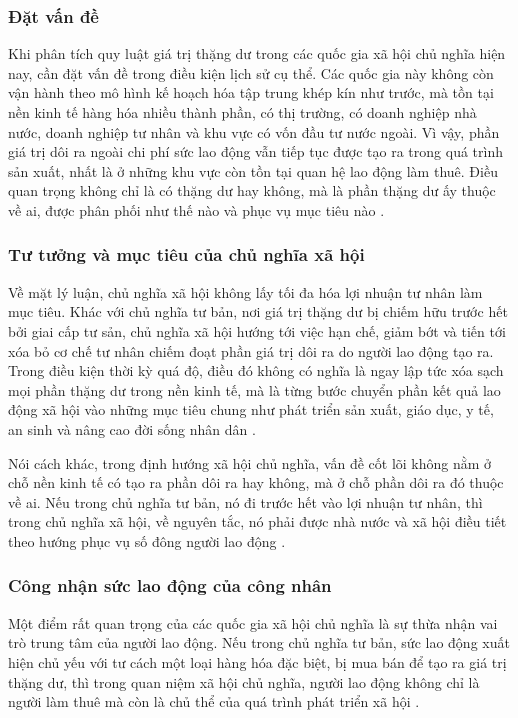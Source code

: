\subsubsection{Đặt vấn đề}

Khi phân tích quy luật giá trị thặng dư trong các quốc gia xã hội chủ nghĩa hiện nay, cần đặt vấn đề trong điều kiện lịch sử cụ thể. Các quốc gia này không còn vận hành theo mô hình kế hoạch hóa tập trung khép kín như trước, mà tồn tại nền kinh tế hàng hóa nhiều thành phần, có thị trường, có doanh nghiệp nhà nước, doanh nghiệp tư nhân và khu vực có vốn đầu tư nước ngoài. Vì vậy, phần giá trị dôi ra ngoài chi phí sức lao động vẫn tiếp tục được tạo ra trong quá trình sản xuất, nhất là ở những khu vực còn tồn tại quan hệ lao động làm thuê. Điều quan trọng không chỉ là có thặng dư hay không, mà là phần thặng dư ấy thuộc về ai, được phân phối như thế nào và phục vụ mục tiêu nào \cite{gt,marx,lenin}.

\subsubsection{Tư tưởng và mục tiêu của chủ nghĩa xã hội}

Về mặt lý luận, chủ nghĩa xã hội không lấy tối đa hóa lợi nhuận tư nhân làm mục tiêu. Khác với chủ nghĩa tư bản, nơi giá trị thặng dư bị chiếm hữu trước hết bởi giai cấp tư sản, chủ nghĩa xã hội hướng tới việc hạn chế, giảm bớt và tiến tới xóa bỏ cơ chế tư nhân chiếm đoạt phần giá trị dôi ra do người lao động tạo ra. Trong điều kiện thời kỳ quá độ, điều đó không có nghĩa là ngay lập tức xóa sạch mọi phần thặng dư trong nền kinh tế, mà là từng bước chuyển phần kết quả lao động xã hội vào những mục tiêu chung như phát triển sản xuất, giáo dục, y tế, an sinh và nâng cao đời sống nhân dân \cite{gt,marx_toantp_t23,lenin,tax-in-kind}.

Nói cách khác, trong định hướng xã hội chủ nghĩa, vấn đề cốt lõi không nằm ở chỗ nền kinh tế có tạo ra phần dôi ra hay không, mà ở chỗ phần dôi ra đó thuộc về ai. Nếu trong chủ nghĩa tư bản, nó đi trước hết vào lợi nhuận tư nhân, thì trong chủ nghĩa xã hội, về nguyên tắc, nó phải được nhà nước và xã hội điều tiết theo hướng phục vụ số đông người lao động \cite{gt,State-and-revol}.

\subsubsection{Công nhận sức lao động của công nhân}

Một điểm rất quan trọng của các quốc gia xã hội chủ nghĩa là sự thừa nhận vai trò trung tâm của người lao động. Nếu trong chủ nghĩa tư bản, sức lao động xuất hiện chủ yếu với tư cách một loại hàng hóa đặc biệt, bị mua bán để tạo ra giá trị thặng dư, thì trong quan niệm xã hội chủ nghĩa, người lao động không chỉ là người làm thuê mà còn là chủ thể của quá trình phát triển xã hội \cite{gt,marx,lenin}.

